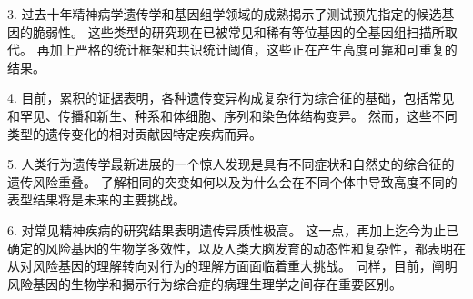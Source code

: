 3. 过去十年精神病学遗传学和基因组学领域的成熟揭示了测试预先指定的候选基因的脆弱性。 
这些类型的研究现在已被常见和稀有等位基因的全基因组扫描所取代。 
再加上严格的统计框架和共识统计阈值，这些正在产生高度可靠和可重复的结果。


4. 目前，累积的证据表明，各种遗传变异构成复杂行为综合征的基础，包括常见和罕见、传播和新生、种系和体细胞、序列和染色体结构变异。 
然而，这些不同类型的遗传变化的相对贡献因特定疾病而异。


5. 人类行为遗传学最新进展的一个惊人发现是具有不同症状和自然史的综合征的遗传风险重叠。 
了解相同的突变如何以及为什么会在不同个体中导致高度不同的表型结果将是未来的主要挑战。


6. 对常见精神疾病的研究结果表明遗传异质性极高。 
这一点，再加上迄今为止已确定的风险基因的生物学多效性，以及人类大脑发育的动态性和复杂性，都表明在从对风险基因的理解转向对行为的理解方面面临着重大挑战。 
同样，目前，阐明风险基因的生物学和揭示行为综合症的病理生理学之间存在重要区别。






